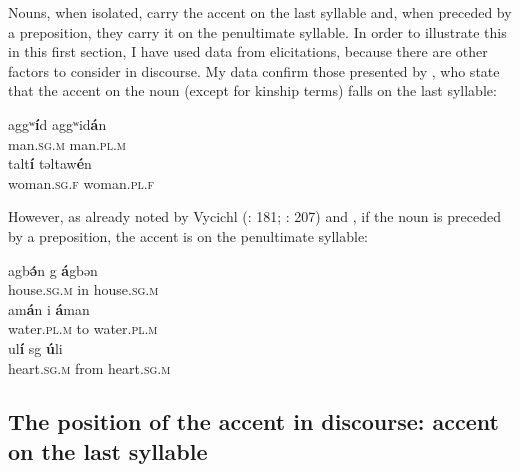 \documentclass[output=paper]{langsci/langscibook}
\begin{document}
Nouns, when isolated, carry the accent on the last syllable and, when preceded by a preposition, they carry it on the penultimate syllable. In order to illustrate this in this first section, I have used data from elicitations, because there are other factors to consider in discourse. My data confirm those presented by \cite{louali:philippson:05}, who state that the accent on the noun (except for kinship terms) falls on the last syllable:

\begin{exe}
\ex\label{5ex:1}
\gll	aggʷ{\textbf{í}}d		\hspace*{1.4cm} aggʷid{\textbf{á}}n \\
	man.{\textsc{sg.m}}		{} man.{\textsc{pl.m}} \\
\glt
\ex\label{5ex:2}
\gll	talt{\textbf{í}}			\hspace*{1cm} təltaw{\textbf{é}}n \\
	woman.{\textsc{sg.f}}	{} woman.{\textsc{pl.f}} \\
\glt
\end{exe}

However, as already noted by Vycichl (\citeyear{vycichl:81}: 181; \citeyear{vycichl:05}: 207) and \cite[][12]{louali:philippson:05}, if the noun is preceded by a preposition, the accent is on the penultimate syllable:

\begin{exe}
\ex\label{5ex:3}
\gll	agb{\textbf{ə́}}n		\hspace*{0.95cm}	g 	{\textbf{á}}gbən \\
	house.{\textsc{sg.m}}	{} in 	house.{\textsc{sg.m}} \\
\glt
\ex\label{5ex:4}
\gll	am{\textbf{á}}n		\hspace*{1cm}	i	{\textbf{á}}man \\
	water.{\textsc{pl.m}}	{} to 	water.{\textsc{pl.m}} \\
\glt
\ex\label{5ex:5}
\gll	ul{\textbf{í}}			\hspace*{1cm}	sg 	{\textbf{ú}}li \\
	heart.{\textsc{sg.m}}	{} from	heart.{\textsc{sg.m}} \\
\glt
\end{exe}


\subsection{The position of the accent in discourse: accent on the last syllable}\label{5sec:22}
\end{document}
